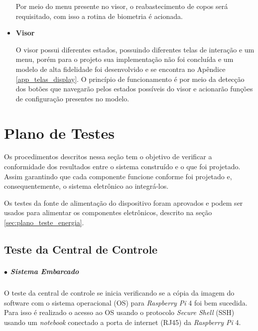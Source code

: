 \begin{itemize}
    Por meio do menu presente no visor, o reabastecimento de copos será requisitado, com isso a rotina de biometria é acionada.
    
    \item \textbf{Visor}
    
    O visor possui diferentes estados, possuindo diferentes telas de interação e um menu, porém para o projeto sua implementação não foi concluída e um modelo de alta fidelidade foi desenvolvido e se encontra no Apêndice  \ref{app_telas_display}. O princípio de funcionamento é por meio da detecção dos botões que navegarão pelos estados possíveis do visor e acionarão funções de configuração presentes no modelo.
    
    
\end{itemize}
\section{Plano de Testes}

Os procedimentos descritos nessa seção tem o objetivo de verificar a conformidade dos resultados entre o sistema construído e o que foi projetado. Assim garantindo que cada componente funcione conforme foi projetado e, consequentemente, o sistema eletrônico ao integrá-los. 

Os testes da fonte de alimentação do dispositivo foram aprovados e podem ser usados para alimentar os componentes eletrônicos, descrito na seção \ref{sec:plano_teste_energia}.

\subsection{Teste da Central de Controle}\label{sec:teste_cc}


\subparagraph*{$\bullet$ Sistema Embarcado} \hfill

O teste da central de controle se inicia verificando se a cópia da imagem do software com o sistema operacional (OS) para \textit{Raspberry Pi} 4 foi bem sucedida. Para isso é realizado o acesso ao OS usando o protocolo \textit{Secure Shell} (SSH) usando um \textit{notebook} conectado a porta de internet (RJ45) da \textit{Raspberry Pi} 4. 

